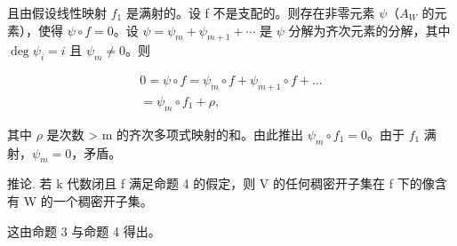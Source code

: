 且由假设线性映射 \(f_{1}\) 是满射的。设 f 不是支配的。则存在非零元素 \(\psi\)（\(A_{W}\) 的元素），使得 \(\psi \circ f = 0\)。设 \(\psi = \psi_{m} + \psi_{m+1} + \cdots\) 是 \(\psi\) 分解为齐次元素的分解，其中 \(\deg \psi_{i} = i\) 且 \(\psi_{m} \neq 0\)。则

\[
\begin{array}{l} 0 = \psi \circ f = \psi_ {m} \circ f + \psi_ {m + 1} \circ f + \dots \\ = \psi_ {m} \circ f _ {1} + \rho , \end{array}
\]

其中 \(\rho\) 是次数 \textgreater{} m 的齐次多项式映射的和。由此推出 \(\psi_{m} \circ f_{1} = 0\)。由于 \(f_{1}\) 满射，\(\psi_{m} = 0\)，矛盾。

推论. 若 k 代数闭且 f 满足命题 4 的假定，则 V 的任何稠密开子集在 f 下的像含有 W 的一个稠密开子集。

这由命题 3 与命题 4 得出。